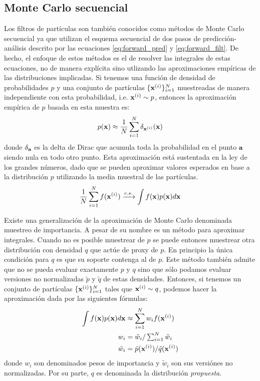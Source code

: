 \subsection{Monte Carlo secuencial}

Los filtros de partículas son también conocidos como métodos de Monte Carlo secuencial ya que utilizan el esquema secuencial de dos pasos de predicción-análisis descrito por las ecuaciones \ref{eq:forward_pred} y \ref{eq:forward_filt}. De hecho, el enfoque de estos métodos es el de resolver las integrales de estas ecuaciones, no de manera explícita sino utlizando las aproximaciones empíricas de las distribuciones implicadas. Si tenemos una función de densidad de probabilidades $p$ y una conjunto de partículas $\{\mathbf{x}^{(i)}\}_{i=1}^N$ muestreadas de manera independiente con esta probabilidad, i.e. $\mathbf{x}^{(i)}\sim p$, entonces la aproximación empírica de $p$ basada en esta muestra es:
\begin{align*}
    p(\mathbf{x}) \approx \frac{1}{N}\sum_{i=1}^N \delta_{\mathbf{x}^{(i)}}(\mathbf{x})
\end{align*}
donde $\delta_{\mathbf{a}}$ es la delta de Dirac que acumula toda la probabilidad en el punto $\mathbf{a}$ siendo nula en todo otro punto. Esta aproximación está sustentada en la ley de los grandes números, dado que se pueden aproximar valores esperados en base a la distribución $p$ utilizando la media muestral de las partículas.
\begin{align*}
    \frac{1}{N}\sum_{i=1}^N f(\mathbf{x}^{(i)}) \xrightarrow{c. s.} \int f(\mathbf{x}) p(\mathbf{x}) d \mathbf{x}
\end{align*}

Existe una generalización de la aproximación de Monte Carlo denominada muestreo de importancia. A pesar de su nombre es un método para aproximar integrales. Cuando no es posible muestrear de $p$ se puede entonces muestrear otra distribución con densidad $q$ que actúe de proxy de $p$. En principio la única condición para $q$ es que su soporte contenga al de $p$. Este método también admite que no se pueda evaluar exactamente $p$ y $q$ sino que sólo podamos evaluar versiones no normalizadas $\tilde{p}$ y $\tilde{q}$ de estas densidades. Entonces, si tenemos un conjunto de partículas $\{\mathbf{x}^{(i)}\}_{i=1}^N$ tales que $\mathbf{x}^{(i)}\sim q$, podemos hacer la aproximación dada por las siguientes fórmulas:
\begin{align*}
    \int f(\mathbf{x}) p(\mathbf{x}) d \mathbf{x} &\approx \sum_{i=1}^N w_i f(\mathbf{x}^{(i)}) \\
    w_i &= \tilde{w}_i / \textstyle\sum_{i=1}^N \tilde{w}_i \\
    \tilde{w}_i &= \tilde{p}(\mathbf{x}^{(i)}) / \tilde{q}(\mathbf{x}^{(i)})
\end{align*}
donde $w_i$ son denominados pesos de importancia y $\tilde{w}_i$ son sus versiónes no normalizadas. Por su parte, $q$ es denominada la distribución \textit{propuesta}.

